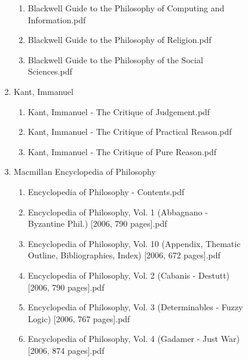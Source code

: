 \documentclass[11pt]{article}
\begin{document}
\begin{enumerate}
\begin{enumerate}
\begin{enumerate}
\begin{enumerate}
\begin{enumerate}
\begin{enumerate}
\item Blackwell Guide to the Philosophy of Computing and Information.pdf
\label{sec-1-1-1-1-7-3-39-14-8}

\item Blackwell Guide to the Philosophy of Religion.pdf
\label{sec-1-1-1-1-7-3-39-14-9}

\item Blackwell Guide to the Philosophy of the Social Sciences.pdf
\label{sec-1-1-1-1-7-3-39-14-10}
\end{enumerate}

\item Kant, Immanuel
\label{sec-1-1-1-1-7-3-39-15}
\begin{enumerate}
\item Kant, Immanuel - The Critique of Judgement.pdf
\label{sec-1-1-1-1-7-3-39-15-1}

\item Kant, Immanuel - The Critique of Practical Reason.pdf
\label{sec-1-1-1-1-7-3-39-15-2}

\item Kant, Immanuel - The Critique of Pure Reason.pdf
\label{sec-1-1-1-1-7-3-39-15-3}
\end{enumerate}

\item Macmillan Encyclopedia of Philosophy
\label{sec-1-1-1-1-7-3-39-16}
\begin{enumerate}
\item Encyclopedia of Philosophy - Contents.pdf
\label{sec-1-1-1-1-7-3-39-16-1}

\item Encyclopedia of Philosophy, Vol. 1 (Abbagnano - Byzantine Phil.) [2006, 790 pages].pdf
\label{sec-1-1-1-1-7-3-39-16-2}

\item Encyclopedia of Philosophy, Vol. 10 (Appendix, Thematic Outline, Bibliographies, Index) [2006, 672 pages].pdf
\label{sec-1-1-1-1-7-3-39-16-3}

\item Encyclopedia of Philosophy, Vol. 2 (Cabanis - Destutt) [2006, 790 pages].pdf
\label{sec-1-1-1-1-7-3-39-16-4}

\item Encyclopedia of Philosophy, Vol. 3 (Determinables - Fuzzy Logic) [2006, 767 pages].pdf
\label{sec-1-1-1-1-7-3-39-16-5}

\item Encyclopedia of Philosophy, Vol. 4 (Gadamer - Just War) [2006, 874 pages].pdf
\label{sec-1-1-1-1-7-3-39-16-6}


\end{enumerate}
\end{enumerate}
\end{enumerate}
\end{enumerate}
\end{enumerate}
\end{enumerate}
\end{document}
